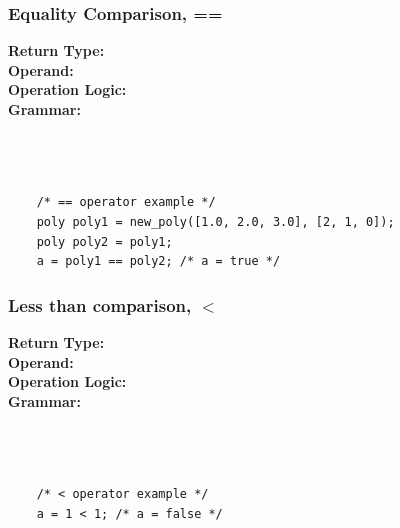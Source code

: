 \documentclass{article}
\begin{document}
    \subsubsection{Equality Comparison, ==}
    \textbf{Return Type:}\\
    \textbf{Operand:}\\
    \textbf{Operation Logic:}\\
    \textbf{Grammar:}\\
    \\
    \\
    \\
    \begin{lstlisting}
    /* == operator example */
    poly poly1 = new_poly([1.0, 2.0, 3.0], [2, 1, 0]);
    poly poly2 = poly1;
    a = poly1 == poly2; /* a = true */
    \end{lstlisting}
    
    \subsubsection{Less than comparison, $<$}
    \textbf{Return Type:}\\
    \textbf{Operand:}\\
    \textbf{Operation Logic:}\\
    \textbf{Grammar:}\\
    \\
    \\
    \\
    \begin{lstlisting}
    /* < operator example */
    a = 1 < 1; /* a = false */
    \end{lstlisting}
    
\end{document}
